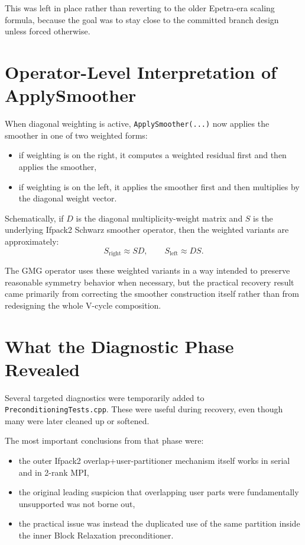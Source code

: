\documentclass[11pt]{article}
\begin{document}
This was left in place rather than reverting to the older Epetra-era scaling formula, because the goal was to stay close to the committed branch design unless forced otherwise.

\section{Operator-Level Interpretation of ApplySmoother}
When diagonal weighting is active, \texttt{ApplySmoother(...)} now applies the smoother in one of two weighted forms:
\begin{itemize}
  \item if weighting is on the right, it computes a weighted residual first and then applies the smoother,
  \item if weighting is on the left, it applies the smoother first and then multiplies by the diagonal weight vector.
\end{itemize}

Schematically, if \(D\) is the diagonal multiplicity-weight matrix and \(S\) is the underlying Ifpack2 Schwarz smoother operator, then the weighted variants are approximately:
\[
S_{\mathrm{right}} \approx S D,
\qquad
S_{\mathrm{left}} \approx D S.
\]

The GMG operator uses these weighted variants in a way intended to preserve reasonable symmetry behavior when necessary, but the practical recovery result came primarily from correcting the smoother construction itself rather than from redesigning the whole V-cycle composition.

\section{What the Diagnostic Phase Revealed}
Several targeted diagnostics were temporarily added to \texttt{PreconditioningTests.cpp}. These were useful during recovery, even though many were later cleaned up or softened.

The most important conclusions from that phase were:
\begin{itemize}
  \item the outer Ifpack2 overlap+user-partitioner mechanism itself works in serial and in 2-rank MPI,
  \item the original leading suspicion that overlapping user parts were fundamentally unsupported was not borne out,
  \item the practical issue was instead the duplicated use of the same partition inside the inner Block Relaxation preconditioner.
\end{itemize}
\end{document}
